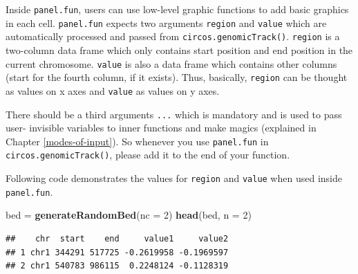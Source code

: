 \documentclass[]{book}
\newenvironment{Shaded}{\begin{snugshade}}{\end{snugshade}}
\newcommand{\KeywordTok}[1]{\textcolor[rgb]{0.13,0.29,0.53}{\textbf{#1}}}
\newcommand{\DataTypeTok}[1]{\textcolor[rgb]{0.13,0.29,0.53}{#1}}
\newcommand{\DecValTok}[1]{\textcolor[rgb]{0.00,0.00,0.81}{#1}}
\newcommand{\StringTok}[1]{\textcolor[rgb]{0.31,0.60,0.02}{#1}}
\newcommand{\OtherTok}[1]{\textcolor[rgb]{0.56,0.35,0.01}{#1}}
\newcommand{\ControlFlowTok}[1]{\textcolor[rgb]{0.13,0.29,0.53}{\textbf{#1}}}
\newcommand{\OperatorTok}[1]{\textcolor[rgb]{0.81,0.36,0.00}{\textbf{#1}}}
\newcommand{\NormalTok}[1]{#1}
\theoremstyle{definition}
\theoremstyle{definition}
\theoremstyle{remark}
\begin{document}
Inside \texttt{panel.fun}, users can use low-level graphic functions to
add basic graphics in each cell. \texttt{panel.fun} expects two
arguments \texttt{region} and \texttt{value} which are automatically
processed and passed from \texttt{circos.genomicTrack()}.
\texttt{region} is a two-column data frame which only contains start
position and end position in the current chromosome. \texttt{value} is
also a data frame which contains other columns (start for the fourth
column, if it exists). Thus, basically, \texttt{region} can be thought
as values on x axes and \texttt{value} as values on y axes.

There should be a third arguments \texttt{...} which is mandatory and is
used to pass user- invisible variables to inner functions and make
magics (explained in Chapter \ref{modes-of-input}). So whenever you use
\texttt{panel.fun} in \texttt{circos.genomicTrack()}, please add it to
the end of your function.

Following code demonstrates the values for \texttt{region} and
\texttt{value} when used inside \texttt{panel.fun}.

\begin{Shaded}
\begin{Highlighting}[]
\NormalTok{bed =}\StringTok{ }\KeywordTok{generateRandomBed}\NormalTok{(}\DataTypeTok{nc =} \DecValTok{2}\NormalTok{)}
\KeywordTok{head}\NormalTok{(bed, }\DataTypeTok{n =} \DecValTok{2}\NormalTok{)}
\end{Highlighting}
\end{Shaded}

\begin{verbatim}
##    chr  start    end     value1     value2
## 1 chr1 344291 517725 -0.2619958 -0.1969597
## 2 chr1 540783 986115  0.2248124 -0.1128319
\end{verbatim}

\begin{Shaded}
\end{Shaded}
\end{document}
